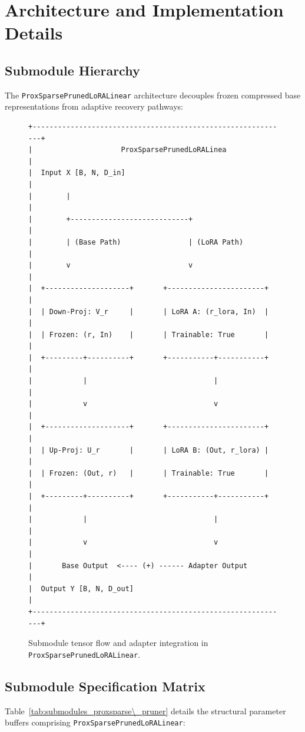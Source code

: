\section{Architecture and Implementation Details}

\subsection{Submodule Hierarchy}
The \texttt{ProxSparsePrunedLoRALinear} architecture decouples frozen compressed base representations from adaptive recovery pathways:

\begin{figure}[H]
\centering
\begin{verbatim}
+-------------------------------------------------------------+
|                     ProxSparsePrunedLoRALinea               |
|  Input X [B, N, D_in]                                       |
|        |                                                    |
|        +----------------------------+                       |
|        | (Base Path)                | (LoRA Path)           |
|        v                            v                       |
|  +--------------------+       +-----------------------+     |
|  | Down-Proj: V_r     |       | LoRA A: (r_lora, In)  |     |
|  | Frozen: (r, In)    |       | Trainable: True       |     |
|  +---------+----------+       +-----------+-----------+     |
|            |                              |                 |
|            v                              v                 |
|  +--------------------+       +-----------------------+     |
|  | Up-Proj: U_r       |       | LoRA B: (Out, r_lora) |     |
|  | Frozen: (Out, r)   |       | Trainable: True       |     |
|  +---------+----------+       +-----------+-----------+     |
|            |                              |                 |
|            v                              v                 |
|       Base Output  <---- (+) ------ Adapter Output          |
|  Output Y [B, N, D_out]                                     |
+-------------------------------------------------------------+
\end{verbatim}
\caption{Submodule tensor flow and adapter integration in \texttt{ProxSparsePrunedLoRALinear}.}
\end{figure}

\subsection{Submodule Specification Matrix}
Table~\ref{tab:submodules_proxsparse\_pruner} details the structural parameter buffers comprising \texttt{ProxSparsePrunedLoRALinear}:

